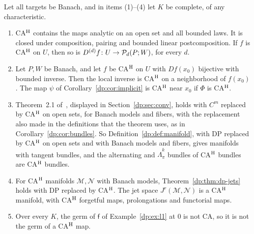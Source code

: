 \begin{theorem}\label{dp:thm:cah}
Let all targets be Banach, and in items \textup{(1)--(4)} let $K$ be complete, of any characteristic.
\begin{enumerate}
\item CA$^{\rm H}$ contains the maps analytic on an open set and all bounded laws. It is closed under composition, pairing and bounded linear postcomposition. If $f$ is CA$^{\rm H}$ on $U$, then so is $D^{(d)}f\colon U\to\mathcal P_d(P;W)$, for every $d$.
\item Let $P,W$ be Banach, and let $f$ be CA$^{\rm H}$ on $U$ with $Df(x_0)$ bijective with bounded inverse. Then the local inverse is CA$^{\rm H}$ on a neighborhood of $f(x_0)$. The map $\psi$ of Corollary~\ref{dp:cor:implicit} is CA$^{\rm H}$ near $x_0$ if $\Phi$ is CA$^{\rm H}$.
\item Theorem~2.1 of~\cite{I}, displayed in Section~\ref{dp:sec:conv}, holds with $C^m$ replaced by CA$^{\rm H}$ on open sets, for Banach models and fibers, with the replacement also made in the definitions that the theorem uses, as in Corollary~\ref{dp:cor:bundles}. So Definition~\ref{dp:def:manifold}, with DP replaced by CA$^{\rm H}$ on open sets and with Banach models and fibers, gives manifolds with tangent bundles, and the alternating and $\widehat\Lambda^k_\pi$ bundles of CA$^{\rm H}$ bundles are CA$^{\rm H}$ bundles.
\item For CA$^{\rm H}$ manifolds $\mathcal M,\mathcal N$ with Banach models, Theorem~\ref{dp:thm:dp-jets} holds with DP replaced by CA$^{\rm H}$. The jet space $J^r(\mathcal M,\mathcal N)$ is a CA$^{\rm H}$ manifold, with CA$^{\rm H}$ forgetful maps, prolongations and functorial maps.
\item Over every $K$, the germ of $\mathsf f$ of Example~\ref{dp:ex:l1} at $0$ is not CA, so it is not the germ of a CA$^{\rm H}$ map.
\end{enumerate}
\end{theorem}

